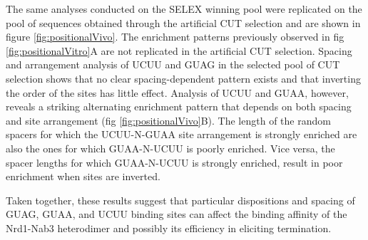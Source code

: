 The same analyses conducted on the \invitro{} SELEX winning pool were replicated on the pool of sequences obtained through the \invivo{} artificial CUT selection and are shown in figure \ref{fig:positionalVivo}. The enrichment patterns previously observed in fig \ref{fig:positionalVitro}A are not replicated in the artificial CUT selection. Spacing and arrangement analysis of UCUU and GUAG in the selected pool of \invivo{} CUT selection shows that no clear spacing-dependent pattern exists and that inverting the order of the sites has little effect. Analysis of UCUU and GUAA, however, reveals a striking alternating enrichment pattern that depends on both spacing and site arrangement (fig \ref{fig:positionalVivo}B). The length of the random spacers for which the UCUU-N-GUAA site arrangement is strongly enriched are also the ones for which GUAA-N-UCUU is poorly enriched. Vice versa, the spacer lengths for which GUAA-N-UCUU is strongly enriched, result in poor enrichment when sites are inverted. 

Taken together, these results suggest that particular dispositions and spacing of GUAG, GUAA, and UCUU binding sites can affect the binding affinity of the Nrd1-Nab3 heterodimer and possibly its efficiency in eliciting termination. 

